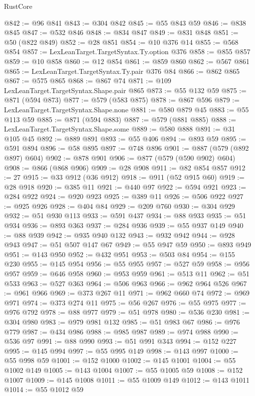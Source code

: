 \begin{lexlean}{RustCore}
\begin{coremodule}
@842 := @96 @841
@843 := @304 @842
@845 := @55 @843 @59
@846 := @838 @845
@847 := @532 @846
@848 := @834 @847
@849 := @831 @848
@851 := @50 (@822 @849)
@852 := @28 @851
@854 := @10 @376 @14
@855 := @568 @854
@857 := LexLeanTarget.TargetSyntax.Ty.option @376
@858 := @855 @857
@859 := @10 @858
@860 := @12 @854
@861 := @859 @860
@862 := @567 @861
@865 := LexLeanTarget.TargetSyntax.Ty.pair @376 @84
@866 := @862 @865
@867 := @575 @865
@868 := @867 @74
@871 := @109 LexLeanTarget.TargetSyntax.Shape.pair @865
@873 := @55 @132 @59
@875 := @871 (@594 @873)
@877 := @579 (@583 @875)
@878 := @867 @596
@879 := LexLeanTarget.TargetSyntax.Shape.none
@881 := @580 @879 @45
@883 := @55 @113 @59
@885 := @871 (@594 @883)
@887 := @579 (@881 @885)
@888 := LexLeanTarget.TargetSyntax.Shape.some
@889 := @580 @888
@891 := @31 @105 @45
@892 := @889 @891
@893 := @55 @406
@894 := @893 @59
@895 := @591 @894
@896 := @58 @895
@897 := @748 @896
@901 := @887 (@579 (@892 @897) @604)
@902 := @878 @901
@906 := @877 (@579 (@590 @902) @604)
@908 := @866 (@868 @906)
@909 := @28 @908
@911 := @82 @854 @857
@912 := 27
@915 := @33 @912 (@36 @912)
@918 := @911 (@52 @915 @60)
@919 := @28 @918
@920 := @385 @11
@921 := @440 @97
@922 := @594 @921
@923 := @284 @922
@924 := @920 @923
@925 := @389 @11
@926 := @506 @922
@927 := @925 @926
@928 := @404 @84
@929 := @209 @760
@930 := @304 @929
@932 := @51 @930 @113
@933 := @591 @437
@934 := @88 @933
@935 := @51 @934
@936 := @893 @363
@937 := @284 @936
@939 := @55 @937 @149
@940 := @88 @939
@942 := @935 @940 @132
@943 := @932 @942
@944 := @928 @943
@947 := @51 @507 @147 @67
@949 := @55 @947 @59
@950 := @893 @949
@951 := @143 @950
@952 := @432 @951
@953 := @503 @84
@954 := @155 @230
@955 := @145 @954
@956 := @55 @955
@957 := @527 @59
@958 := @956 @957
@959 := @646 @958
@960 := @953 @959
@961 := @513 @11
@962 := @51 @533
@963 := @527 @363
@964 := @506 @963
@966 := @962 @964 @526
@967 := @961 @966
@969 := @373 @267 @11
@971 := @962 @660 @74
@972 := @969 @971
@974 := @373 @274 @11
@975 := @56 @267
@976 := @55 @975
@977 := @976 @792
@978 := @88 @977
@979 := @51 @978
@980 := @536 @230
@981 := @304 @980
@983 := @979 @981 @132
@985 := @51 @983 @67
@986 := @976 @779
@987 := @434 @986
@988 := @985 @987
@989 := @974 @988
@990 := @536 @97
@991 := @88 @990
@993 := @51 @991 @343
@994 := @152 @227
@995 := @145 @994
@997 := @55 @995 @149
@998 := @143 @997
@1000 := @55 @998 @59
@1001 := @152 @1000
@1002 := @145 @1001
@1004 := @55 @1002 @149
@1005 := @143 @1004
@1007 := @55 @1005 @59
@1008 := @152 @1007
@1009 := @145 @1008
@1011 := @55 @1009 @149
@1012 := @143 @1011
@1014 := @55 @1012 @59

\end{coremodule}
\end{lexlean}
